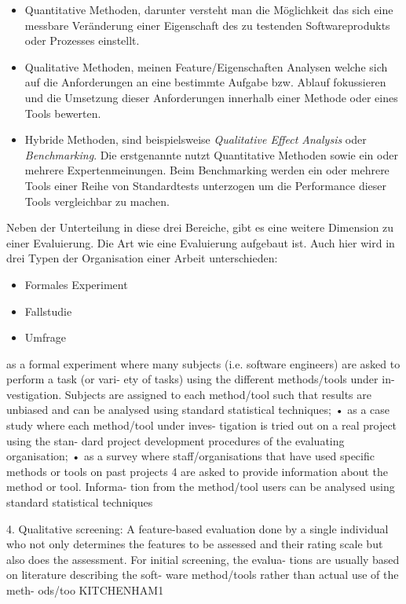 \documentclass[draft=false
              ,paper=a4
              ,twoside=false
              ,fontsize=11pt
              ,headsepline
              ,BCOR10mm
              ,DIV11
              ]{scrbook}
\begin{document}
\begin{itemize}
  \item Quantitative Methoden, darunter versteht man die Möglichkeit das sich eine messbare Veränderung einer Eigenschaft des zu testenden Softwareprodukts oder Prozesses einstellt.
  \item Qualitative Methoden, meinen Feature/Eigenschaften Analysen welche sich auf die Anforderungen an eine bestimmte Aufgabe bzw. Ablauf fokussieren und die Umsetzung dieser Anforderungen innerhalb einer Methode oder eines Tools bewerten.
  \item Hybride Methoden, sind beispielsweise \textit{Qualitative Effect Analysis} oder \textit{Benchmarking}. Die erstgenannte nutzt Quantitative Methoden sowie ein oder mehrere Expertenmeinungen. Beim Benchmarking werden ein oder mehrere Tools einer Reihe von Standardtests unterzogen um die Performance dieser Tools vergleichbar zu machen.
\end{itemize}

Neben der Unterteilung in diese drei Bereiche, gibt es eine weitere Dimension zu einer Evaluierung. Die Art wie eine Evaluierung aufgebaut ist. Auch hier wird in drei Typen der Organisation einer Arbeit unterschieden:

\begin{itemize}
  \item Formales Experiment
  \item Fallstudie
  \item Umfrage
\end{itemize}

as  a  formal  experiment  where  many  subjects  (i.e.  software  engineers)  are  asked  to  perform  a  task  (or  vari-  ety  of  tasks)  using  the  different  methods/tools  under  in-  vestigation.  Subjects  are  assigned  to  each  method/tool  such  that  results  are  unbiased  and  can  be  analysed  using  standard  statistical  techniques;  •  as  a  case  study  where  each  method/tool  under  inves-  tigation  is  tried  out  on  a  real  project  using  the  stan-  dard  project  development  procedures  of  the  evaluating  organisation;  •  as  a  survey  where  staff/organisations  that  have  used  specific  methods  or  tools  on  past  projects  4  are  asked  to  provide  information  about  the  method  or  tool.  Informa-  tion  from  the  method/tool  users  can  be  analysed  using  standard  statistical  techniques

4. Qualitative screening: A feature-based evaluation done by a  single individual who not only determines the features to be assessed and their rating scale but also does the assessment. For  initial screening, the evalua- tions are usually based  on literature describing the soft- ware method/tools rather than actual use of the meth- ods/too KITCHENHAM1
\end{document}

